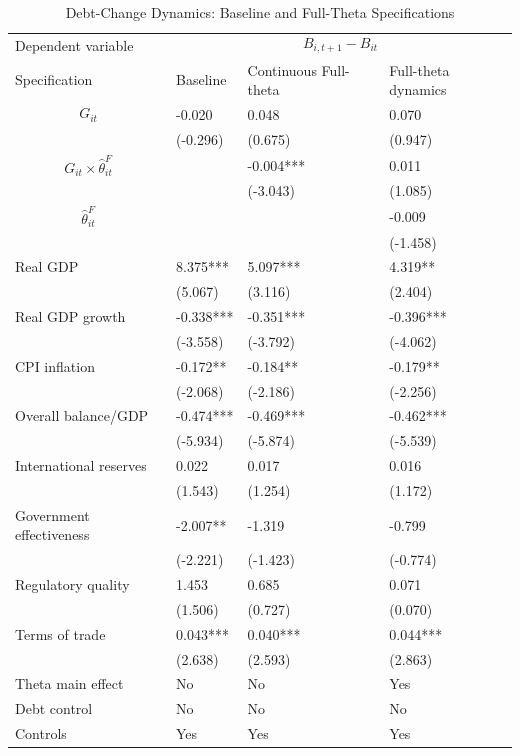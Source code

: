 \begin{table}[H]\centering
\begin{threeparttable}
\caption{Debt-Change Dynamics: Baseline and Full-Theta Specifications}
\label{tab:debt_change_combined_fulltheta}
\scriptsize
\begin{tabularx}{\textwidth}{lYYY}
\toprule
Dependent variable &  \\
\cmidrule(lr){2-4}
Specification & Baseline & Continuous Full-theta & Full-theta dynamics \\
\midrule
$$G_{it}$$ & -0.020 & 0.048 & 0.070 \\
 & (-0.296) & (0.675) & (0.947) \\
$$G_{it}\times\widehat{\theta}^{F}_{it}$$ &  & -0.004*** & 0.011 \\
 &  & (-3.043) & (1.085) \\
$$\widehat{\theta}^{F}_{it}$$ &  &  & -0.009 \\
 &  &  & (-1.458) \\
Real GDP & 8.375*** & 5.097*** & 4.319** \\
 & (5.067) & (3.116) & (2.404) \\
Real GDP growth & -0.338*** & -0.351*** & -0.396*** \\
 & (-3.558) & (-3.792) & (-4.062) \\
CPI inflation & -0.172** & -0.184** & -0.179** \\
 & (-2.068) & (-2.186) & (-2.256) \\
Overall balance/GDP & -0.474*** & -0.469*** & -0.462*** \\
 & (-5.934) & (-5.874) & (-5.539) \\
International reserves & 0.022 & 0.017 & 0.016 \\
 & (1.543) & (1.254) & (1.172) \\
Government effectiveness & -2.007** & -1.319 & -0.799 \\
 & (-2.221) & (-1.423) & (-0.774) \\
Regulatory quality & 1.453 & 0.685 & 0.071 \\
 & (1.506) & (0.727) & (0.070) \\
Terms of trade & 0.043*** & 0.040*** & 0.044*** \\
 & (2.638) & (2.593) & (2.863) \\
\midrule
Theta main effect & No & No & Yes \\
Debt control & No & No & No \\
Controls & Yes & Yes & Yes \\

\end{tabularx}
\end{threeparttable}
\end{table}
